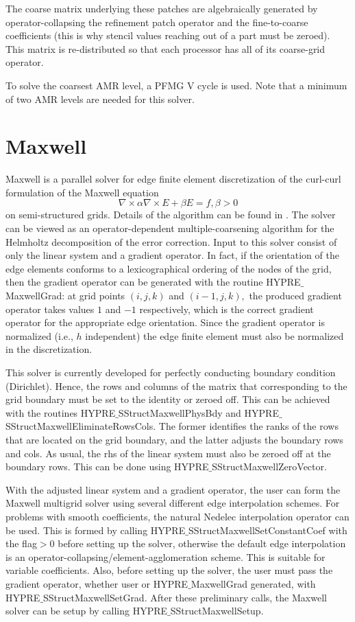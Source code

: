 The coarse matrix underlying these patches are algebraically generated by operator-collapsing the 
refinement patch operator and the fine-to-coarse coefficients (this is why stencil values reaching
out of a part must be zeroed). This matrix is re-distributed so that each processor has all of its
coarse-grid operator.

To solve the coarsest AMR level, a PFMG V cycle is used. Note that a minimum of two AMR levels
are needed for this solver.


\section{Maxwell}

Maxwell is a parallel solver for edge finite element discretization of the
curl-curl formulation of the Maxwell equation
\[ \nabla \times \alpha \nabla \times E + \beta E= f, \beta> 0\]
on semi-structured grids. Details of the algorithm can be found in \cite{JonesLee_2006}.
The solver can be viewed as an operator-dependent multiple-coarsening algorithm for the Helmholtz
decomposition of the error correction. Input to this solver consist of only the linear system
and a gradient operator. In fact, if the orientation of the edge elements conforms to
a lexicographical ordering of the nodes of the grid, then the gradient operator can be generated
with the routine HYPRE$\_$MaxwellGrad: at grid points $(i,j,k)$ and $(i-1,j,k),$
the produced gradient operator takes values $1$ and $-1$ respectively, which
is the correct gradient operator for the appropriate edge orientation. Since the gradient operator
is normalized (i.e., $h$ independent) the edge finite element must also be normalized in the
discretization.

This solver is currently developed for perfectly conducting boundary condition (Dirichlet). Hence, the
rows and columns of the matrix that corresponding to the grid boundary must be set to the identity or
zeroed off. This can be achieved with the routines HYPRE$\_$SStructMaxwellPhysBdy and 
HYPRE$\_$SStructMaxwellEliminateRowsCols. The former identifies the ranks of the rows that are located on
the grid boundary, and the latter adjusts the boundary rows and cols. As usual, the rhs of the linear system
must also be zeroed off at the boundary rows. This can be done using HYPRE$\_$SStructMaxwellZeroVector.

With the adjusted linear system and a gradient operator, the user can form the Maxwell multigrid solver using 
several different edge interpolation schemes. For problems with smooth coefficients, the natural Nedelec
interpolation operator can be used. This is formed by calling HYPRE$\_$SStructMaxwellSetConstantCoef 
with the flag$>0$ before setting up the solver, otherwise the default edge interpolation is an
operator-collapsing/element-agglomeration scheme. This is suitable for variable coefficients.
Also, before setting up the solver, the user must pass the gradient operator, whether user or 
HYPRE$\_$MaxwellGrad generated, with HYPRE$\_$SStructMaxwellSetGrad. After these
preliminary calls, the Maxwell solver can be setup by calling HYPRE$\_$SStructMaxwellSetup.

